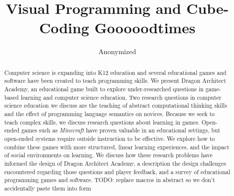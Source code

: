 \documentclass{sig-alternate}
\newcommand{\TODO}[1]{{\color{red} TODO: #1}}
\newcommand{\gametitle}{{\color{RoyalPurple} Dragon Architect Academy}}
\begin{document}
%

\title{Visual Programming and Cube-Coding Gooooodtimes}

\author{Anonymized}


\maketitle
\begin{abstract}
Computer science is expanding into K12 education and several educational games and software have been created to teach programming skills. We present \gametitle{}, an educational game built to explore under-researched questions in game-based learning and computer science education. Two research questions in computer science education we discuss are the teaching of abstract computational thinking skills and the effect of programming language semantics on novices. Because we seek to teach complex skills, we discuss research questions about learning in games. Open-ended games such as \emph{Minecraft} have proven valuable in an educational settings, but open-ended systems require outside instruction to be effective. We explore how to combine these games with more structured, linear learning experiences, and the impact of social environments on learning. We discuss how these research problems have informed the design of \gametitle{}, a description the design challenges encountered regarding those questions and player feedback, and a survey of educational programming games and software.
\TODO{replace macros in abstract so we don't accidentally paste them into form}
\end{abstract}
\end{document}
